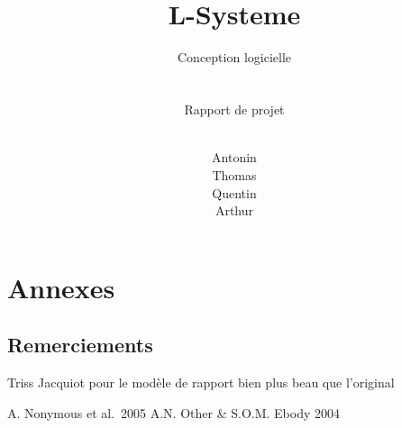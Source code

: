\documentclass[
	headsepline=on,
	footsepline=on,
	twoside=off,
	abstract=on,
	DIV=10
]{scrreprt}
\title{
	\hrulefill
	\vfill\\
	\Huge \bfseries \\L-Systeme
}
\subtitle{
	Conception logicielle\\
	\hfill
	\\
	\hrulefill
	\hfill\\
	{\normalfont Rapport de projet}
}
\author{
	\small
	\hfill\\
	Antonin \bsc{Boyon}\\
    Thomas \bsc{Lalong}\\ 
    Quentin \bsc{Legot}\\
    Arthur \bsc{Page}
}
\date{}
\begin{document}
	
\maketitle
{}
\tableofcontents
\listoffigures
\clearpage
	
	
	
 
	
	
	
	
	
	\cleardoublepage
	\pagebreak
	
	\chapter{Annexes}
        \section{Remerciements}
		    Triss Jacquiot pour le modèle de rapport bien plus beau que l'original
		    \begin{thebibliography}{}
                A. Nonymous et al.\ 2005
                A.N. Other \& S.O.M. Ebody 2004
		    \end{thebibliography}
	
	
\end{document}
